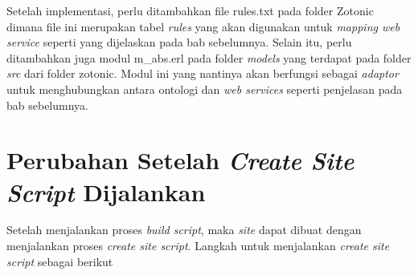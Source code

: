 	Setelah implementasi, perlu ditambahkan file rules.txt pada folder Zotonic dimana file ini merupakan tabel \textit{rules} yang akan digunakan untuk \textit{mapping web service} seperti yang dijelaskan pada bab sebelumnya. Selain itu, perlu ditambahkan juga modul m\_abs.erl pada folder \textit{models} yang terdapat pada folder \textit{src} dari folder zotonic. Modul ini yang nantinya akan berfungsi sebagai \textit{adaptor} untuk menghubungkan antara ontologi dan \textit{web services} seperti penjelasan pada bab sebelumnya.
		
\section{Perubahan Setelah \textit{Create Site Script} Dijalankan}

Setelah menjalankan proses \textit{build script}, maka \textit{site} dapat dibuat dengan menjalankan proses \textit{create site script}. Langkah untuk menjalankan \textit{create site script} sebagai berikut

